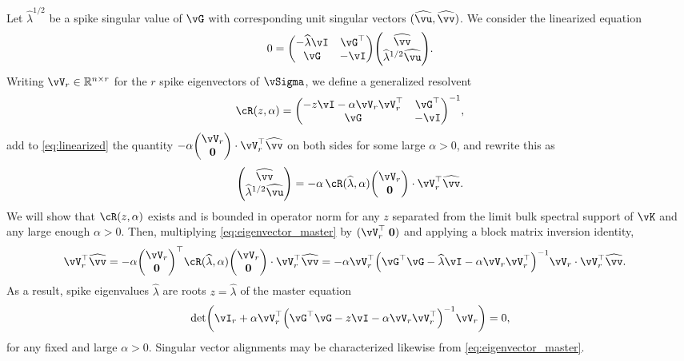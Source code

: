 Let $\widehat\lambda^{1/2}$ be a spike singular value of $\vG$ with
corresponding unit singular vectors $(\widehat\vu,\widehat\vv)$. We consider the
linearized equation
\begin{equation}\label{eq:linearized}
0=\begin{pmatrix} -\widehat{\lambda}\vI & \vG^\top \\ \vG & -\vI \end{pmatrix}
\begin{pmatrix} \widehat\vv \\ \widehat{\lambda}^{1/2}\widehat\vu
\end{pmatrix}.\end{equation}
Writing $\vV_r \in \R^{n \times r}$ for the $r$ spike eigenvectors of $\vSigma$,
we define a generalized resolvent
\[\vcR(z,\alpha)=\begin{pmatrix} -z\vI-\alpha\vV_r\vV_r^\top & \vG^\top \\ \vG & -\vI
\end{pmatrix}^{-1},\]
add to \eqref{eq:linearized} the quantity
$-\alpha \begin{pmatrix} \vV_r \\ \mathbf{0}
\end{pmatrix} \cdot \vV_r^\top \widehat \vv$ on both sides for some large
$\alpha>0$, and rewrite this as
\begin{equation} \label{eq:eigenvector_master}
\begin{pmatrix} \widehat\vv \\ \widehat\lambda^{1/2}\widehat\vu \end{pmatrix}
=-\alpha\,\vcR(\widehat\lambda,\alpha)\begin{pmatrix}\vV_r \\ \mathbf{0} \end{pmatrix}
\cdot \vV_r^\top \widehat\vv.
\end{equation}
We will show that $\vcR(z,\alpha)$ exists and is bounded in operator norm
for any $z$ separated from the limit
bulk spectral support of $\vK$ and any large enough $\alpha>0$. Then,
multiplying \eqref{eq:eigenvector_master} by $(\vV_r^\top\;\mathbf{0})$ and
applying a block matrix inversion identity,
\begin{align*}
\vV_r^\top \widehat\vv&={-}\alpha \begin{pmatrix} \vV_r \\ \mathbf{0}
\end{pmatrix}^\top \vcR(\widehat\lambda,\alpha)\begin{pmatrix}\vV_r \\ \mathbf{0} \end{pmatrix}
\cdot \vV_r^\top \widehat\vv
=-\alpha \vV_r^\top\Big(\vG^\top
\vG-\widehat\lambda \vI-\alpha\vV_r\vV_r^\top \Big)^{-1}\vV_r \cdot \vV_r^\top \widehat\vv.
\end{align*}
As a result, spike eigenvalues $\widehat\lambda$ are roots
$z=\widehat\lambda$ of the master equation
	\[\det\left(\vI_{r}+\alpha
\vV_r^\top\Big(\vG^\top\vG-z\vI-\alpha\vV_r\vV_r^\top\Big)^{-1}\vV_r \right)=0,\]
for any fixed and large $\alpha>0$. Singular vector alignments may be
characterized likewise from \eqref{eq:eigenvector_master}.

